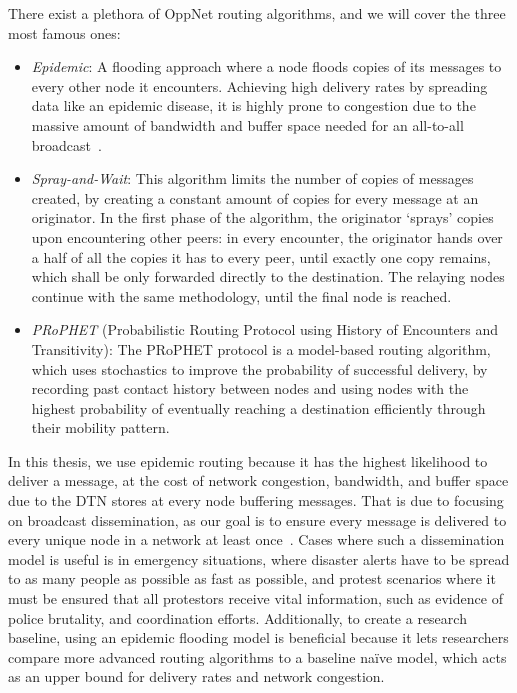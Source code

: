 There exist a plethora of OppNet routing algorithms, and we will cover the three most famous ones:\begin{itemize}
    \item \emph{Epidemic}: A flooding approach where a node floods copies of its messages to every other node it encounters. Achieving high delivery rates by spreading data like an epidemic disease, it is highly prone to congestion due to the massive amount of bandwidth and buffer space needed for an all-to-all broadcast~\cite{Ott2006,Almeida2012}.
    \item \emph{Spray-and-Wait}: This algorithm limits the number of copies of messages created, by creating a constant amount of copies for every message at an originator. In the first phase of the algorithm, the originator `sprays' copies upon encountering other peers: in every encounter, the originator hands over a half of all the copies it has to every peer, until exactly one copy remains, which shall be only forwarded directly to the destination. The relaying nodes continue with the same methodology, until the final node is reached.
    \item \emph{PRoPHET} (Probabilistic Routing Protocol using History of Encounters and Transitivity): The PRoPHET protocol is a model-based routing algorithm, which uses stochastics to improve the probability of successful delivery, by recording past contact history between nodes and using nodes with the highest probability of eventually reaching a destination efficiently through their mobility pattern.
\end{itemize}
In this thesis, we use epidemic routing because it has the highest likelihood to deliver a message, at the cost of network congestion, bandwidth, and buffer space due to the DTN stores at every node buffering messages. That is due to focusing on broadcast dissemination, as our goal is to ensure every message is delivered to every unique node in a network at least once~\cite{Schmidheiser2025}. Cases where such a dissemination model is useful is in emergency situations, where disaster alerts have to be spread to as many people as possible as fast as possible, and protest scenarios where it must be ensured that all protestors receive vital information, such as evidence of police brutality, and coordination efforts.
Additionally, to create a research baseline, using an epidemic flooding model is beneficial because it lets researchers compare more advanced routing algorithms to a baseline naïve model, which acts as an upper bound for delivery rates and network congestion.
